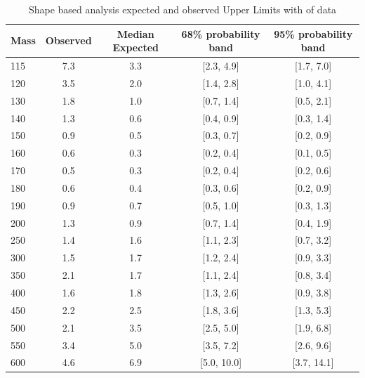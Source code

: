 \begin{table}
{\scriptsize
 \begin{center}
 \begin{tabular}{l| c c c c }
 \hline
Mass     &           Observed &   Median Expected   &      68\% probability band &   95\% probability band \\
 \hline
115 &                7.3 &  3.3 &  [2.3, 4.9]  &    [1.7, 7.0] \\
120 &                3.5 &  2.0 &  [1.4, 2.8]  &    [1.0, 4.1] \\
130 &                1.8 &  1.0 &  [0.7, 1.4]  &    [0.5, 2.1] \\
140 &                1.3 &  0.6 &  [0.4, 0.9]  &    [0.3, 1.4] \\
150 &                0.9 &  0.5 &  [0.3, 0.7]  &    [0.2, 0.9] \\
160 &                0.6 &  0.3 &  [0.2, 0.4]  &    [0.1, 0.5]\\
170 &                0.5 &  0.3 &  [0.2, 0.4]  &    [0.2, 0.6]\\
180 &                0.6 &  0.4 &  [0.3, 0.6]  &    [0.2, 0.9]\\
190 &                0.9 &  0.7 &  [0.5, 1.0]  &    [0.3, 1.3]\\
200 &                1.3 &  0.9 &  [0.7, 1.4]  &    [0.4, 1.9]\\
250 &                1.4 &  1.6 &  [1.1, 2.3]  &    [0.7, 3.2]\\
300 &                1.5 &  1.7 &  [1.2, 2.4]  &    [0.9, 3.3]\\
350 &                2.1 &  1.7 &  [1.1, 2.4]  &    [0.8, 3.4]\\
400 &                1.6 &  1.8 &  [1.3, 2.6]  &    [0.9, 3.8]\\
450 &                2.2 &  2.5 &  [1.8, 3.6]  &    [1.3, 5.3]\\
500 &                2.1 &  3.5 &  [2.5, 5.0]  &    [1.9, 6.8]\\
550 &                3.4 &  5.0 &  [3.5, 7.2]  &    [2.6, 9.6]\\
600 &                4.6 &  6.9 &  [5.0, 10.0] &    [3.7, 14.1]\\
 \hline
\end{tabular}
\end{center}
}
\caption{Shape based analysis expected and observed Upper Limits with \intlumi of data}
\label{tab:shape_limits_data}
\end{table}


